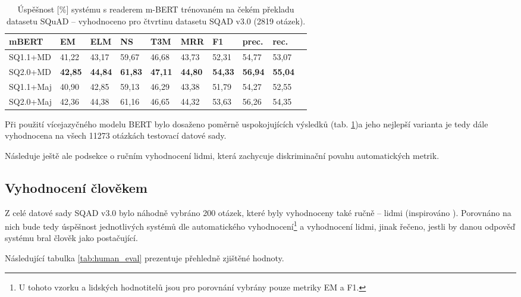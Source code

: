 \begin{table}[H]
    \centering
    \begin{tabular}{|l||l|l|l|l|l|l|l|l|l|}
        \hline
        \textbf{mBERT}  & \textbf{EM}   & ELM       & NS        & T3M       & MRR       & \textbf{F1}   & prec.         & rec.      \\ \hline\hline
            SQ1.1+MD    & 41,22         & 43,17     & 59,67     & 46,68     & 43,73     & 52,31         & 54,77         & 53,07     \\ \hline
            SQ2.0+MD    & \textbf{42,85}&\textbf{44,84}&\textbf{61,83}&\textbf{47,11}&\textbf{44,80}&\textbf{54,33}&\textbf{56,94}&\textbf{55,04}\\ \hline
            SQ1.1+Maj   & 40,90         & 42,85     & 59,13     & 46,29     & 43,38     & 51,79         & 54,27         & 52,55         \\ \hline
            SQ2.0+Maj   & 42,36         & 44,38     & 61,16     & 46,65     & 44,32     & 53,63         & 56,26         & 54,35     \\ \hline
    \end{tabular}
    \caption{Úspěšnost [\%] systému s readerem m-BERT trénovaném na čekém překladu datasetu SQuAD -- vyhodnoceno pro čtvrtinu datasetu SQAD v3.0 (2819 otázek).}
    \label{tab:system_eval_mbert}
\end{table}

Při použití vícejazyčného modelu BERT bylo dosaženo poměrně uspokojujících výsledků (tab. \ref{tab:system_eval_mbert})a jeho nejlepší varianta je tedy dále vyhodnocena na všech 11273 otázkách testovací datové sady.\par
Následuje ještě ale podsekce o ručním vyhodnocení lidmi, která zachycuje diskriminační povahu automatických metrik.\pagebreak

\subsection{Vyhodnocení člověkem}
\label{human_eval}
Z celé datové sady SQAD v3.0 bylo náhodně vybráno 200 otázek, které byly vyhodnoceny také ručně -- lidmi (inspirováno \cite{min2021neurips}). Porovnáno na nich bude tedy úspěšnost jednotlivých systémů dle automatického vyhodnocení\footnote{U tohoto vzorku a lidských hodnotitelů jsou pro porovnání vybrány pouze metriky EM a F1.} a vyhodnocení lidmi, jinak řečeno, jestli by danou odpověď systému bral člověk jako postačující.\par
Následující tabulka \ref{tab:human_eval} prezentuje přehledně zjištěné hodnoty.

